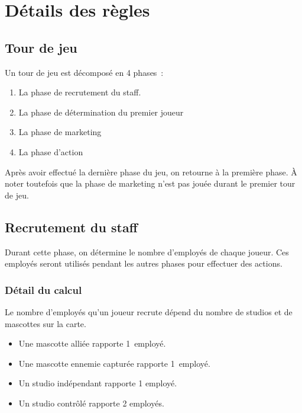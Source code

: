 \chapter{Détails des règles} \label{chapter:detail-regles}

        \section{Tour de jeu}

            Un tour de jeu est décomposé en 4 phases :

            \begin{enumerate}
                \item La phase de recrutement du staff.
                \item La phase de détermination du premier joueur
                \item La phase de marketing
                \item La phase d'action
            \end{enumerate}

            Après avoir effectué la dernière phase du jeu, on retourne à la première phase.
            À noter toutefois que la phase de marketing n'est pas jouée durant le premier tour de jeu.

        \section{Recrutement du staff}
            Durant cette phase, on détermine le nombre d'employés de chaque joueur. Ces employés seront utilisés
            pendant les autres phases pour effectuer des actions.

            \subsection{Détail du calcul}
                Le nombre d'employés qu'un joueur recrute dépend du nombre de studios et de mascottes sur la carte.
                \begin{itemize}
                    \item Une mascotte alliée rapporte 1 employé.
                    \item Une mascotte ennemie capturée rapporte 1 employé.
                    \item Un studio indépendant rapporte 1 employé.
                    \item Un studio contrôlé rapporte 2 employés.
                \end{itemize}

